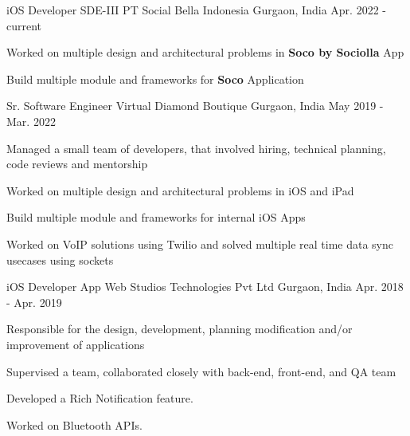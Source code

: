 


\begin{cventries}

\bigskip
\cventry
{iOS Developer SDE-III} %
{PT Social Bella Indonesia} %
{Gurgaon, India} %
{Apr. 2022 - current} %
{ %
\begin{cvitems}
\item {Worked on multiple design and architectural problems in \textbf{Soco by Sociolla} App }
\item {Build multiple module and frameworks for \textbf{Soco} Application}
\end{cvitems}
}
\bigskip


\cventry
{Sr. Software Engineer} %
{Virtual Diamond Boutique} %
{Gurgaon, India} %
{May 2019 - Mar. 2022} %
{ %
\begin{cvitems}
\item {Managed a small team of developers, that involved hiring, technical planning, code reviews and mentorship}
\item {Worked on multiple design and architectural problems in iOS and iPad }
\item {Build multiple module and frameworks for internal iOS Apps}
\item {Worked on VoIP solutions using Twilio and solved multiple real time data sync usecases using sockets }
\end{cvitems}
}
\bigskip


\cventry
{iOS Developer} %
{App Web Studios Technologies Pvt Ltd} %
{Gurgaon, India} %
{Apr. 2018 - Apr. 2019} %
{ %
\begin{cvitems}
\item {Responsible for the design, development, planning modification and/or improvement of applications}
\item {Supervised a team, collaborated closely with back-end, front-end, and QA team}
\item {Developed a Rich Notification feature.}
\item {Worked on Bluetooth APIs.}
\end{cvitems}
}
\bigskip


\end{cventries}

